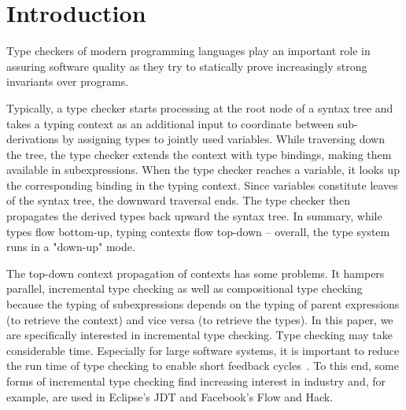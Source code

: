 \documentclass{llncs}
\begin{document}
\newcommand{\smap}{\ensuremath{\mathop{\!\mapsto\!}}}
\newcommand{\subst}[2]{\ensuremath{\{#1\}}#2}
\newcommand{\CSubst}[4]{\ensuremath{{#1} \mathop{=} \{{#3}\smap{#4}\}{#2}}}

\newcommand{\consjoin}[3]{\ensuremath{#1 = #2 \vee #3}}
\newcommand{\joinop}[2]{\ensuremath{#1 \vee #2}}
\newcommand{\consmeet}[3]{\ensuremath{#1 = #2 \wedge #3}}
\newcommand{\meetop}[2]{\ensuremath{#1 \wedge #2}}
\newcommand{\subtpe}{\ensuremath{\mathbin{\!\scalerel{{<}\!}{\colon}\!\!}}}
\newcommand{\conssub}[2]{\ensuremath{#1 \subtpe #2 }}
\newcommand{\pcfsub}{\ensuremath{\text{PCF}_{\subtpe}}}

\newcommand{\annotateNode}[4]{\node[type node, right=of #1] (#1-type) {\typeNode{#2}};
  \node[ctx node, right=of #1-type] (#1-cons) {\consNode{#3}};
  \node[ctx node, right=of #1-cons] (#1-req) {\reqNode{#4}};}
\newcommand{\TNumeric}{\ensuremath{\mathit{Numeric}}\xspace}

\newcommand{\treegen}[3]{\mathit{T}({#1}^{#2},#3)}

\section{Introduction}
\label{sec:introduction}

Type checkers of modern programming languages play an important role in assuring software quality as they try to statically prove increasingly strong invariants over programs. 

Typically, a type checker starts processing at the root node of a syntax tree 
and takes a typing context as an additional input to coordinate between sub-derivations by assigning types to jointly used variables. 
While traversing down the tree, the type checker extends the context with
type bindings, making them available in subexpressions.
When the type checker reaches a variable, it looks up the corresponding binding
in the typing context. Since variables constitute leaves of the syntax tree, the
downward traversal ends. The type checker then propagates the derived types back
upward the syntax tree. In summary, while types flow bottom-up, typing contexts
flow top-down -- overall, the type system runs in a "down-up" mode.

The top-down context propagation of contexts has some problems. It hampers parallel, 
incremental type checking as well as compositional type checking 
because the typing of subexpressions depends on the
typing of parent expressions (to retrieve the context) and vice versa (to
retrieve the types). In this paper, we are specifically interested in incremental type checking. 
Type checking may take considerable time. Especially for large software systems, it is important to reduce the
run time of type checking to enable short feedback cycles~\cite{KuhnMT12}. To this end, some forms of incremental type checking find
increasing interest in industry and, for example, are used in Eclipse's JDT and
Facebook's Flow and Hack. 
\end{document}
